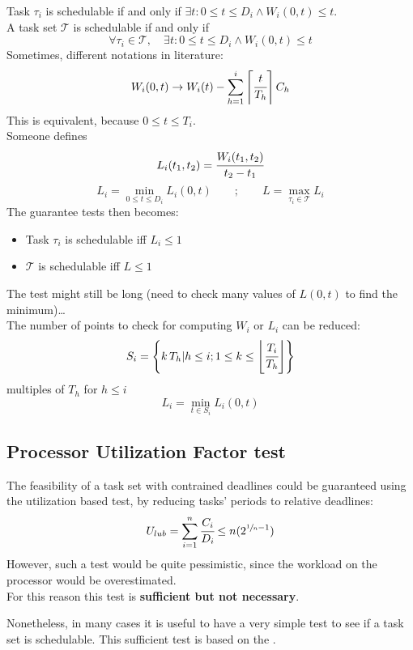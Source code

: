     Task $\tau_i$ is schedulable if and only if $\exists t : 0 \le t \le D_i \wedge W_i(0,t) \le t$.\\
    A task set $\mathcal{T}$ is schedulable if and only if
    \[\forall \tau_i \in \mathcal{T},\quad \exists t : 0 \le t \le D_i \wedge W_i(0,t) \le t\]
    Sometimes, different notations in literature:
    \[W_i(0,t)\rightarrow W_i(t) - \sum_{h=1}^i \left\lceil \cfrac{t}{T_h} \right\rceil C_h\]
    This is equivalent, because $0 \le t \le T_i$.\\
    Someone defines 
    \[L_i(t_1,t_2) = \cfrac{W_i(t_1, t_2)}{t_2 - t_1}\]
    \[L_i = \min_{0\le t\le D_i} L_i(0,t)\qquad;\qquad L = \max_{\tau_i \in \mathcal{T}} L_i\]
    The guarantee tests then becomes:
    \begin{itemize}
        \item Task $\tau_i$ is schedulable iff $L_i \le 1$
        \item $\mathcal{T}$ is schedulable iff $L \le 1$
    \end{itemize}
    The test might still be long (need to check many values of $L(0,t)$ to find the minimum)\dots\\
    The number of points to check for computing $W_i$ or $L_i$ can be reduced:
    \[S_i = \left\{k\,T_h | h \le i; 1 \le k \le \left\lfloor \cfrac{T_i}{T_h} \right\rfloor\right\}\]
    multiples of $T_h$ for $h \le i$
    \[L_i = \min_{t\in S_i} L_i(0,t)\]


\subsection{Processor Utilization Factor test}
The feasibility of a task set with contrained deadlines could be guaranteed using the utilization based test, by reducing tasks' periods to relative deadlines:
\[U_{lub} = \sum_{i=1}^n \cfrac{C_i}{D_i} \le n(2^{\sfrac{1}{n}-1})\]
However, such a test would be quite pessimistic, since the workload on the processor would be overestimated.\\
For this reason this test is \textbf{sufficient but not necessary}.

Nonetheless, in many cases it is useful to have a very simple test to see if a task set is schedulable.
This sufficient test is based on the .

